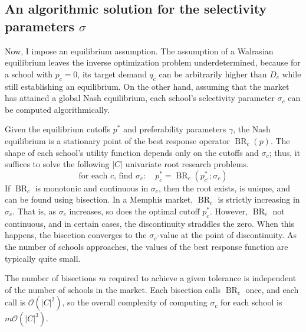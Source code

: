 \documentclass[12pt]{article}
\numberwithin{equation}{subsection}
\theoremstyle{definition}
\begin{document}
\subsection{An algorithmic solution for the selectivity parameters $\sigma$}
Now, I impose an equilibrium assumption. The assumption of a Walrasian equilibrium leaves the inverse optimization problem underdetermined, because for a school with $p_c = 0$, its target demand $q_c$ can be arbitrarily higher than $D_c$ while still establishing an equilibrium. On the other hand, assuming that the market has attained a global Nash equilibrium, each school's selectivity parameter $\sigma_c$ can be computed algorithmically. 

Given the equilibrium cutoffs $p^*$ and preferability parameters $\gamma$, the Nash equilibrium is a stationary point of the best response operator $\operatorname{BR}_c(p)$. The shape of each school's utility function depends only on the cutoffs and $\sigma_c$; thus, it suffices to solve the following $|C|$ univariate root research problems. 
\[\text{for each } c\text{, find } \sigma_c :\quad p^*_c = \operatorname{BR}_c  (p^*_{c'} ; \sigma_c) \]
If $\operatorname{BR}_c$ is monotonic and continuous in $\sigma_c$, then the root exists, is unique, and can be found using bisection. In a Memphis market, $\operatorname{BR}_c$ is strictly increasing in $\sigma_c$. That is, as $\sigma_c$ increases, so does the optimal cutoff $p^*_c$.  However, $\operatorname{BR}_c$ not continuous, and in certain cases, the discontinuity straddles the zero. When this happens, the bisection converges to the $\sigma_c$-value at the point of discontinuity. As the number of schools approaches, the values of the best response function are typically quite small. 

The number of bisections $m$ required to achieve a given tolerance is independent of the number of schools in the market. Each bisection calls $\operatorname{BR}_c$ once, and each call is $\mathcal{O}(|C|^2)$, so the overall complexity of computing $\sigma_c$ for each school is $m \mathcal{O}( |C|^3)$.
\end{document}
